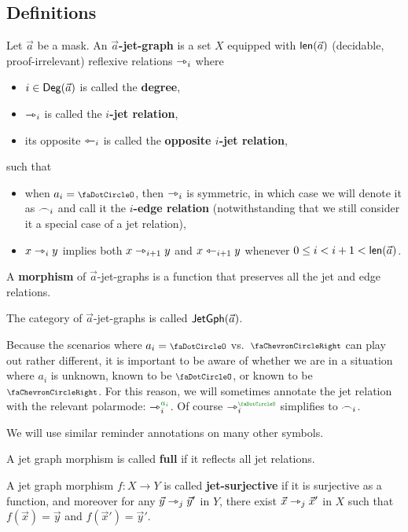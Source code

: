 \documentclass[a4paper]{memoir}
\begin{document}
\subsection{Definitions} \label{sec:jetgph:def}
\begin{definition} \label{def:jetgph}
	Let $\vec a$ be a mask. An \textbf{$\vec a$-jet-graph} is a set $X$ equipped with $\mathsf{len}(\vec a)$ (decidable, proof-irrelevant) reflexive relations $\rightarrowtriangle_i$ where
	\begin{itemize}
		\item $i \in {\mathsf{Deg}}(\vec a)$ is called the \textbf{degree},
		\item $\rightarrowtriangle_i$ is called the \textbf{$i$-jet relation},
		\item its opposite $\leftarrowtriangle_i$ is called the \textbf{opposite $i$-jet relation},
	\end{itemize}
	such that
	\begin{itemize}
		\item when $a_i = \npolar$, then $\rightarrowtriangle_i$ is symmetric, in which case we will denote it as $\frown_i$ and call it the \textbf{$i$-edge relation} (notwithstanding that we still consider it a special case of a jet relation),
		\item $x \rightarrowtriangle_i y$ implies both $x \rightarrowtriangle_{i+1} y$ and $x \leftarrowtriangle_{i+1} y$ whenever $0 \leq i < i+1 < \mathsf{len}(\vec a)$.
	\end{itemize}
	A \textbf{morphism} of $\vec a$-jet-graphs is a function that preserves all the jet and edge relations.
	
	The category of $\vec a$-jet-graphs is called $\mathsf{JetGph}(\vec a)$.
\end{definition}
\begin{notation} \label{not:polarmode-reminder}
	Because the scenarios where $a_i = \npolar$ vs.\ $\ypolar$ can play out rather different, it is important to be aware of whether we are in a situation where $a_i$ is unknown, known to be $\npolar$, or known to be $\ypolar$.
	For this reason, we will sometimes annotate the jet relation with the relevant polarmode: $\jet_i\pmr{a_i}$.
	Of course $\jet_i\pmr\npolar$ simplifies to $\frown_i$.
	
	We will use similar reminder annotations on many other symbols.
\end{notation}
\begin{definition} \label{def:full-jetgphhom}
	A jet graph morphism is called \textbf{full} if it reflects all jet relations.
\end{definition}
\begin{definition} \label{def:jet-surjective}
	A jet graph morphism $f : X \to Y$ is called \textbf{jet-surjective} if it is surjective as a function, and moreover for any $\vec y \rightarrowtriangle_j \vec y'$ in $Y$, there exist $\vec x \rightarrowtriangle_j \vec x'$ in $X$ such that $f(\vec x) = \vec y$ and $f(\vec x') = \vec y'$. 
\end{definition}
\end{document}
